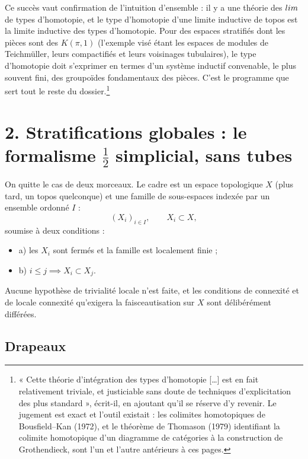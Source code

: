 \documentclass[11pt,a4paper]{article}
\begin{document}
Ce succès vaut confirmation de l'intuition d'ensemble : il y a une théorie des
$\varinjlim$ de types d'homotopie, et le type d'homotopie d'une limite inductive
de topos est la limite inductive des types d'homotopie. Pour des espaces
stratifiés dont les pièces sont des $K(\pi,1)$ (l'exemple visé étant les espaces
de modules de Teichmüller, leurs compactifiés et leurs voisinages tubulaires),
le type d'homotopie doit s'exprimer en termes d'un système inductif convenable,
le plus souvent fini, des groupoïdes fondamentaux des pièces. C'est le programme
que sert tout le reste du dossier.\footnote{« Cette théorie d'intégration des
types d'homotopie […] est en fait relativement triviale, et justiciable sans
doute de techniques d'explicitation des plus standard », écrit-il, en ajoutant
qu'il se réserve d'y revenir. Le jugement est exact et l'outil existait : les
colimites homotopiques de Bousfield--Kan (1972), et le théorème de Thomason
(1979) identifiant la colimite homotopique d'un diagramme de catégories à la
construction de Grothendieck, sont l'un et l'autre antérieurs à ces pages.}

\section*{2. Stratifications globales : le formalisme $\tfrac{1}{2}$ simplicial, sans tubes}

On quitte le cas de deux morceaux. Le cadre est un espace topologique $X$ (plus
tard, un topos quelconque) et une famille de sous-espaces indexée par un
ensemble ordonné $I$ :
\[
  (X_{i})_{i \in I}, \qquad X_{i} \subset X,
\]
soumise à deux conditions :

\begin{itemize}
\item a) les $X_{i}$ sont fermés et la famille est localement finie ;
\item b) $i \leq j \implies X_{i} \subset X_{j}$.
\end{itemize}

Aucune hypothèse de trivialité locale n'est faite, et les conditions de connexité
et de locale connexité qu'exigera la faisceautisation sur $X$ sont
délibérément différées.

\subsection*{Drapeaux}
\end{document}
